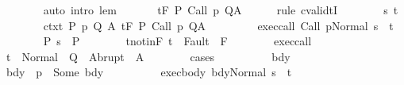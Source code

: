 \begin{isabellebody}
\ \ \ \ \ \ \isamarkupfalse%
\ {\isacharparenleft}auto\ intro{\isacharcolon}\ lem{\isacharparenright}\isanewline
\ \ \ \ \isamarkupfalse%
\ {\isachardoublequoteopen}{\isasymGamma}{\isacharcomma}{\isasymTheta}\ {\isasymTurnstile}\isactrlsub t\isactrlbsub {\isacharslash}F\isactrlesub \ P\ {\isacharparenleft}Call\ p{\isacharparenright}\ Q{\isacharcomma}A{\isachardoublequoteclose}\isanewline
\ \ \ \ \isamarkupfalse%
\ {\isacharparenleft}rule\ cvalidtI{\isacharparenright}\isanewline
\ \ \ \ \ \ \isamarkupfalse%
\ s\ t\isanewline
\ \ \ \ \ \ \isamarkupfalse%
\ ctxt{\isacharcolon}\ {\isachardoublequoteopen}{\isasymforall}{\isacharparenleft}P{\isacharcomma}\ p{\isacharcomma}\ Q{\isacharcomma}\ A{\isacharparenright}{\isasymin}{\isasymTheta}{\isachardot}\ {\isasymGamma}{\isasymTurnstile}\isactrlsub t\isactrlbsub {\isacharslash}F\isactrlesub \ P\ {\isacharparenleft}Call\ p{\isacharparenright}\ Q{\isacharcomma}A{\isachardoublequoteclose}\ \isanewline
\ \ \ \ \ \ \isamarkupfalse%
\ exec{\isacharunderscore}call{\isacharcolon}\ {\isachardoublequoteopen}{\isasymGamma}{\isasymturnstile}{\isasymlangle}Call\ p{\isacharcomma}Normal\ s{\isasymrangle}\ {\isasymRightarrow}\ t{\isachardoublequoteclose}\isanewline
\ \ \ \ \ \ \isamarkupfalse%
\ P{\isacharcolon}\ {\isachardoublequoteopen}s\ {\isasymin}\ P{\isachardoublequoteclose}\isanewline
\ \ \ \ \ \ \isamarkupfalse%
\ t{\isacharunderscore}notin{\isacharunderscore}F{\isacharcolon}\ {\isachardoublequoteopen}t\ {\isasymnotin}\ Fault\ {\isacharbackquote}\ F{\isachardoublequoteclose}\isanewline
\ \ \ \ \ \ \isamarkupfalse%
\ exec{\isacharunderscore}call\ \isamarkupfalse%
\ {\isachardoublequoteopen}t\ {\isasymin}\ Normal\ {\isacharbackquote}\ Q\ {\isasymunion}\ Abrupt\ {\isacharbackquote}\ A{\isachardoublequoteclose}\isanewline
\ \ \ \ \ \ \isamarkupfalse%
\ {\isacharparenleft}cases{\isacharparenright}\isanewline
\ \ \ \ \ \ \ \ \isamarkupfalse%
\ bdy\ \isanewline
\ \ \ \ \ \ \ \ \isamarkupfalse%
\ bdy{\isacharcolon}\ {\isachardoublequoteopen}{\isasymGamma}\ p\ {\isacharequal}\ Some\ bdy{\isachardoublequoteclose}\isanewline
\ \ \ \ \ \ \ \ \isamarkupfalse%
\ exec{\isacharunderscore}body{\isacharcolon}\ {\isachardoublequoteopen}{\isasymGamma}{\isasymturnstile}{\isasymlangle}bdy{\isacharcomma}Normal\ s{\isasymrangle}\ {\isasymRightarrow}\ t{\isachardoublequoteclose}\isanewline
\ \ \ \ \ \ \ \ \isamarkupfalse%

\end{isabellebody}
